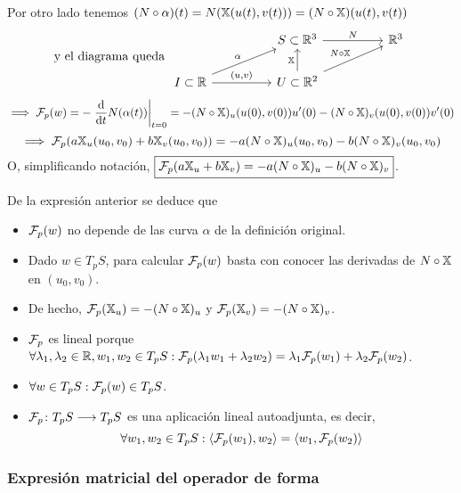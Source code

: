 Por otro lado tenemos $(N\circ \alpha)(t) = N(\mathbb{X}(u(t), v(t))) = (N\circ \mathbb{X})(u(t), v(t))$
\[\tex{y el diagrama queda } \begin{tikzcd}[column sep=huge]
		& S \subset \R^3 \arrow{r}{N} & \R^3 \\
		I\subset \R \arrow{ru}{\alpha} \arrow{r}{(u, v)} & U \subset \R^2 \arrow{u}{\X} \arrow{ur}{N\circ \X} &
	\end{tikzcd}\]
\[\implies \F_p(w) = -\left.\odv{}{t}N(\alpha(t))\right|_{t=0} = - (N\circ \X)_u(u(0), v(0))u'(0) - (N\circ \X)_v(u(0), v(0))v'(0)\]
\[\implies \mathcal{F}_p(a\mathbb{X}_u(u_0, v_0) + b\mathbb{X}_v(u_0, v_0)) = -a(N\circ \mathbb{X})_u(u_0, v_0) - b(N\circ \mathbb{X})_v(u_0, v_0)\]
O, simplificando notación, $\displaystyle \boxed{\mathcal{F}_p(a\mathbb{X}_u + b\mathbb{X}_v) = -a(N\circ \mathbb{X})_u - b(N\circ \mathbb{X})_v}$.

\begin{obs} De la expresión anterior se deduce que
	\begin{itemize}
		\item $\mathcal{F}_p(w)$ no depende de las curva $\alpha$ de la definición original.
		\item Dado $w\in T_pS$, para calcular $\mathcal{F}_p(w)$ basta con conocer las derivadas de $N\circ \mathbb{X}$ en $(u_0, v_0)$.
		\item De hecho, $\mathcal{F}_p(\mathbb{X}_u) = - (N\circ \mathbb{X})_u$ y $\mathcal{F}_p(\mathbb{X}_v) = - (N\circ \mathbb{X})_v$.
		\item $\mathcal{F}_p$ es lineal porque $\forall \lambda_1, \lambda_2 \in \mathbb{R}, w_1, w_2 \in T_pS : \mathcal{F}_p(\lambda_1w_1 + \lambda_2w_2) = \lambda_1\mathcal{F}_p(w_1) + \lambda_2\mathcal{F}_p(w_2)$.
		\item $\forall w \in T_pS : \mathcal{F}_p(w) \in T_pS$.
		\item $\mathcal{F}_p \colon T_pS \longrightarrow T_pS$ es una aplicación lineal autoadjunta, es decir,
		      \[\forall w_1, w_2 \in T_pS : \langle \mathcal{F}_p(w_1), w_2 \rangle = \langle w_1, \mathcal{F}_p(w_2) \rangle\]
	\end{itemize}
\end{obs}

\subsubsection{Expresión matricial del operador de forma}

